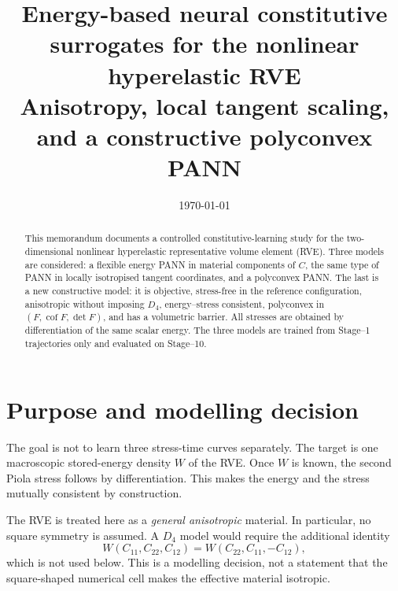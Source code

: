 \documentclass[10pt,a4paper]{article}
\title{Energy-based neural constitutive surrogates for the nonlinear hyperelastic RVE\\
\large Anisotropy, local tangent scaling, and a constructive polyconvex PANN}
\author{}
\date{\today}
\newcommand{\Cof}{\operatorname{cof}}
\begin{document}
\maketitle

\begin{abstract}
This memorandum documents a controlled constitutive-learning study for the
two-dimensional nonlinear hyperelastic representative volume element (RVE).
Three models are considered: a flexible energy PANN in material components of
$C$, the same type of PANN in locally isotropised tangent coordinates, and a
polyconvex PANN.  The last is a new constructive model: it is objective,
stress-free in the reference configuration, anisotropic without imposing
$D_4$, energy--stress consistent, polyconvex in $(F,\Cof F,\det F)$, and has
a volumetric barrier.  All stresses are obtained by differentiation of the
same scalar energy.  The three models are trained from Stage--1 trajectories
only and evaluated on Stage--10.
\end{abstract}

\section{Purpose and modelling decision}
\label{sec:purpose}
The goal is not to learn three stress-time curves separately.  The target is
one macroscopic stored-energy density $W$ of the RVE.  Once $W$ is known, the
second Piola stress follows by differentiation.  This makes the energy and
the stress mutually consistent by construction.

The RVE is treated here as a \emph{general anisotropic} material.  In
particular, no square symmetry is assumed.  A $D_4$ model would require the
additional identity
\begin{equation}
 W(C_{11},C_{22},C_{12})=W(C_{22},C_{11},-C_{12}),
 \label{eq:d4}
\end{equation}
which is not used below.  This is a modelling decision, not a statement that
the square-shaped numerical cell makes the effective material isotropic.
\end{document}
